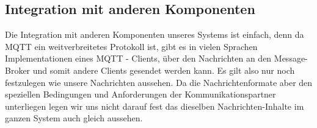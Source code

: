\subsection{Integration mit anderen Komponenten}
Die Integration mit anderen Komponenten unseres Systems ist einfach, denn da MQTT ein weitverbreitetes Protokoll
ist, gibt es in vielen Sprachen Implementationen eines MQTT - Clients, über den Nachrichten an den Message-Broker
und somit andere Clients gesendet werden kann. Es gilt also nur noch festzulegen wie unsere Nachrichten aussehen. 
Da die Nachrichtenformate aber den speziellen Bedingungen und Anforderungen der Kommunikationspartner unterliegen
legen wir uns nicht darauf fest das dieselben Nachrichten-Inhalte im ganzen System auch gleich aussehen.
